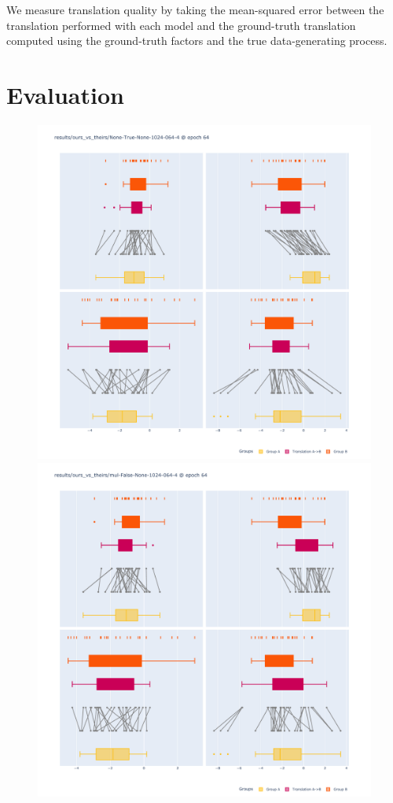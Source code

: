 \documentclass[nohyperref]{article}
\theoremstyle{plain}
\theoremstyle{definition}
\theoremstyle{remark}
\begin{document}
We measure translation quality by taking the mean-squared error between the translation performed with each model and the ground-truth translation computed using the ground-truth factors and the true data-generating process.

\section{Evaluation}

\begin{figure}[ht]
    \vskip 0.2in
    \begin{center}
    \centerline{\includegraphics[width=\columnwidth]{files/ours.pdf}}
    \centerline{\includegraphics[width=\columnwidth]{files/theirs.pdf}}

\end{center}
\end{figure}
\end{document}
